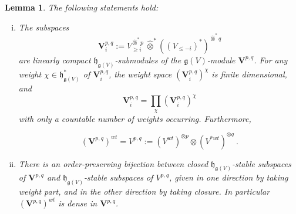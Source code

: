 \documentclass[12pt,reqno]{amsart}
\newtheorem{lem}[thm]{Lemma}
\theoremstyle{definition}
\theoremstyle{remark}
\begin{document}
 	\begin{lem} \label{lem: weightpart}
	The following statements hold:
	\begin{enumerate}[(i)]
	    \item \label{product}
	    The subspaces 
     \[
    \mathbf{V}^{p,q}_{i} :=
     V_{\geq i} ^{\widehat{\otimes}^\ast p}\ \widehat{\otimes}^\ast ((V_{\leq -i})^\ast)^{\widehat{\otimes}^\ast q}
     \]
     are linearly compact $\mathfrak{h}_{\mathfrak{g}(V)}$-submodules of the $\mathfrak{g}(V)$-module $\mathbf{V}^{p,q}$. 
     For any weight $\chi\in \mathfrak{h}_{\mathfrak{g}(V)}^\ast$ of $\mathbf{V}^{p,q}_{i}$, the weight space 
     $(\mathbf{V}^{p,q}_{i})^\chi$ is finite dimensional, and 
	$$
	\mathbf{V}^{p,q}_{i} = \prod_{\chi} (\mathbf{V}^{p,q}_{i})^\chi
	$$
	with only a countable number of weights occurring. Furthermore, 
	
	$$
	(\mathbf{V}^{p,q})^{wt} = V^{p,q} := (V^{wt})^{\otimes p} \otimes (V^{\ast wt})^{\otimes q} \ .
	$$
	
	\item \label{bij}
	There is an order-preserving bijection between closed $\mathfrak{h}_{\mathfrak{g}(V)}$-stable subspaces of $\mathbf{V}^{p,q}$ and $\mathfrak{h}_{\mathfrak{g}(V)}$-stable subspaces of ${V}^{p,q}$, given in one direction by taking
	weight part, and in the other direction by taking closure. In particular $(\mathbf{V}^{p,q})^{wt}$ is dense in
	$\mathbf{V}^{p,q}$.
	\end{enumerate}
	
	
	\end{lem}
	
\end{document}
